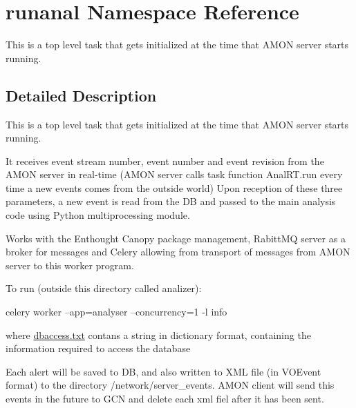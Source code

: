 \hypertarget{namespacerunanal}{\section{runanal Namespace Reference}
\label{namespacerunanal}
}


\begin{DoxyVerb} This is a top level task that gets initialized
 at the time that AMON server starts running.\end{DoxyVerb}
  




\subsection{Detailed Description}
\begin{DoxyVerb} This is a top level task that gets initialized
 at the time that AMON server starts running.\end{DoxyVerb}
 It receives event stream number, event number and event revision from the A\-M\-O\-N server in real-\/time (A\-M\-O\-N server calls task function Anal\-R\-T.\-run every time a new events comes from the outside world) Upon reception of these three parameters, a new event is read from the D\-B and passed to the main analysis code using Python multiprocessing module.

Works with the Enthought Canopy package management, Rabitt\-M\-Q server as a broker for messages and Celery allowing from transport of messages from A\-M\-O\-N server to this worker program.

To run (outside this directory called analizer)\-:

celery worker --app=analyser --concurrency=1 -\/l info

where \hyperlink{dbaccess_8txt}{dbaccess.\-txt} contans a string in dictionary format, containing the information required to access the database

Each alert will be saved to D\-B, and also written to X\-M\-L file (in V\-O\-Event format) to the directory /network/server\-\_\-events. A\-M\-O\-N client will send this events in the future to G\-C\-N and delete each xml fiel after it has been sent. 